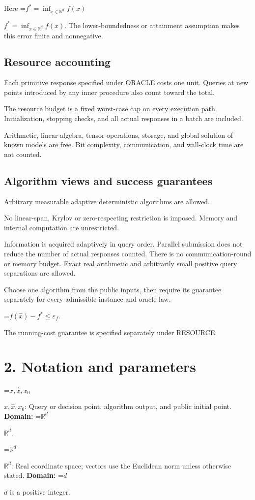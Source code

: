 \documentclass[10pt,a4paper]{article}
\newcommand{\AtlasMath}[1]{\par\begingroup\centering\setbox0=\hbox{$\displaystyle #1$}\ifdim\wd0>1.4\linewidth\typeout{ATLAS WIDE FORMULA: \the\wd0}\fi\ifdim\wd0>\linewidth\resizebox{\linewidth}{!}{\box0}\else\box0\fi\par\endgroup}
\newcommand{\AtlasInlineMath}[1]{\begingroup\setbox0=\hbox{$#1$}\ifdim\wd0>.4\linewidth\endgroup\AtlasMath{#1}\else\endgroup$#1$\fi}
\begin{document}
Here \AtlasInlineMath{f^*=\inf_{x\in \mathbb{R}^d}f(x)}. The lower-boundedness or attainment assumption makes this error finite and nonnegative.

\subsection{Resource accounting}
Each primitive response specified under ORACLE costs one unit. Queries at new points introduced by any inner procedure also count toward the total.

The resource budget is a fixed worst-case cap on every execution path. Initialization, stopping checks, and all actual responses in a batch are included.

Arithmetic, linear algebra, tensor operations, storage, and global solution of known models are free. Bit complexity, communication, and wall-clock time are not counted.

\subsection{Algorithm views and success guarantees}
Arbitrary measurable adaptive deterministic algorithms are allowed.

No linear-span, Krylov or zero-respecting restriction is imposed. Memory and internal computation are unrestricted.

Information is acquired adaptively in query order. Parallel submission does not reduce the number of actual responses counted. There is no communication-round or memory budget. Exact real arithmetic and arbitrarily small positive query separations are allowed.

Choose one algorithm from the public inputs, then require its guarantee separately for every admissible instance and oracle law.


\AtlasMath{f(\widehat{x})-f^*\le \varepsilon_f.}


The running-cost guarantee is specified separately under RESOURCE.

\section{2. Notation and parameters}
\AtlasInlineMath{x,\widehat{x},x_0}: Query or decision point, algorithm output, and public initial point. \textbf{Domain:} \AtlasInlineMath{\mathbb{R}^d}.

\AtlasInlineMath{\mathbb{R}^d}: Real coordinate space; vectors use the Euclidean norm unless otherwise stated. \textbf{Domain:} \AtlasInlineMath{d} is a positive integer.
\end{document}
